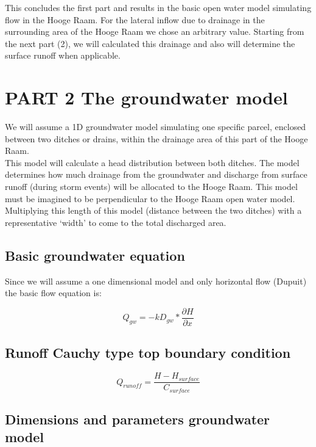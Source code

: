 \documentclass[
]{article}
\begin{document}
This concludes the first part and results in the basic open water model
simulating flow in the Hooge Raam. For the lateral inflow due to
drainage in the surrounding area of the Hooge Raam we chose an arbitrary
value. Starting from the next part (2), we will calculated this drainage
and also will determine the surface runoff when applicable.

\hypertarget{part-2-the-groundwater-model}{%
\section{PART 2 The groundwater
model}\label{part-2-the-groundwater-model}}

We will assume a 1D groundwater model simulating one specific parcel,
enclosed between two ditches or drains, within the drainage area of this
part of the Hooge Raam.\\
This model will calculate a head distribution between both ditches. The
model determines how much drainage from the groundwater and discharge
from surface runoff (during storm events) will be allocated to the Hooge
Raam. This model must be imagined to be perpendicular to the Hooge Raam
open water model. Multiplying this length of this model (distance
between the two ditches) with a representative `width' to come to the
total discharged area.

\hypertarget{basic-groundwater-equation}{%
\subsection{Basic groundwater
equation}\label{basic-groundwater-equation}}

Since we will assume a one dimensional model and only horizontal flow
(Dupuit) the basic flow equation is:

\[
Q_{gw} = -kD_{gw} * \frac {\partial H}{\partial x}
\]

\hypertarget{runoff-cauchy-type-top-boundary-condition}{%
\subsection{Runoff Cauchy type top boundary
condition}\label{runoff-cauchy-type-top-boundary-condition}}

\[
Q_{runoff}= \frac{H - H_{surface}}{C_{surface}}
\]

\hypertarget{dimensions-and-parameters-groundwater-model}{%
\subsection{Dimensions and parameters groundwater
model}\label{dimensions-and-parameters-groundwater-model}}
\end{document}
